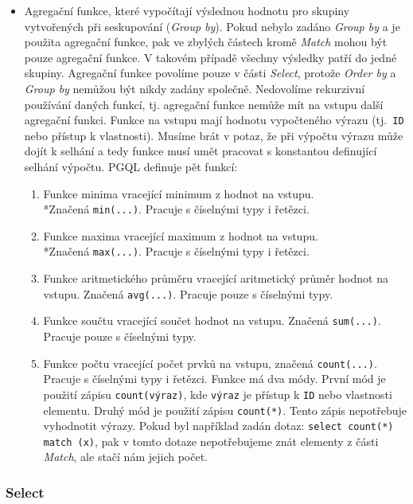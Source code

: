 \begin{itemize}
\item 
Agregační funkce, které vypočítají výslednou hodnotu pro skupiny vytvořených při seskupování (\textit{Group by}).
Pokud nebylo zadáno \textit{Group by} a je použita agregační funkce, pak ve zbylých částech kromě \textit{Match} mohou být pouze agregační funkce.
V takovém případě všechny výsledky patří do jedné skupiny.
Agregační funkce povolíme pouze v části \textit{Select}, protože \textit{Order by} a \textit{Group by} nemůžou být nikdy zadány společně.
Nedovolíme rekurzivní používání daných funkcí, tj. agregační funkce nemůže mít na vstupu další agregační funkci.
Funkce na vstupu mají hodnotu vypočteného výrazu (tj.~\texttt{ID} nebo přístup k vlastnosti).
Musíme brát v potaz, že při výpočtu výrazu může dojít k selhání a tedy funkce musí umět pracovat s konstantou definující selhání výpočtu.
PGQL definuje pět funkcí:
\begin{enumerate}
\item Funkce minima vracející minimum z hodnot na vstupu. 
\\*Značená \texttt{min(...)}.
Pracuje s číselnými typy i řetězci.
\item Funkce maxima vracející maximum z hodnot na vstupu. 
\\*Značená \texttt{max(...)}.
Pracuje s číselnými typy i řetězci.
\item Funkce aritmetického průměru vracející aritmetický průměr hodnot na vstupu.
Značená \texttt{avg(...)}.
Pracuje pouze s číselnými typy.
\item Funkce součtu vracející součet hodnot na vstupu. Značená \texttt{sum(...)}.
Pracuje pouze s číselnými typy.
\item Funkce počtu vracející počet prvků na vstupu, značená \texttt{count(...)}.
Pracuje s číselnými typy i řetězci.
Funkce má dva módy.
První mód je použití zápisu \texttt{count(výraz)}, kde \texttt{výraz} je přístup k \texttt{ID} nebo vlastnosti elementu.
Druhý mód je použití zápisu \texttt{count(*)}.
Tento zápis nepotřebuje vyhodnotit výrazy.
Pokud byl například zadán dotaz:
\texttt{select count(*) match (x)}, pak v tomto dotaze nepotřebujeme znát elementy z části \textit{Match}, ale stačí nám jejich počet.
\end{enumerate}
\end{itemize}

\subsubsection{Select}

